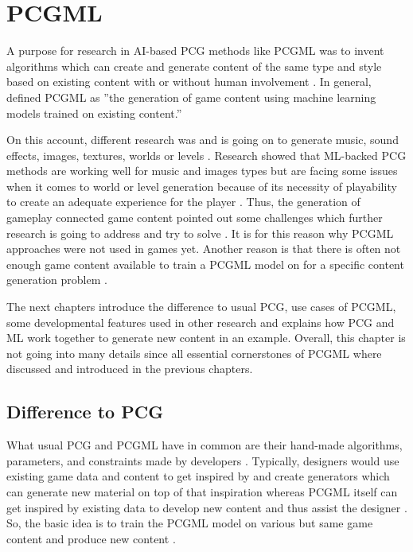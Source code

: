 \documentclass[MGS,Master,english]{twbook}%
\begin{document}
%
%
\clearpage
\chapter{\acl{PCGML}}
A purpose for research in AI-based PCG methods like PCGML was to invent algorithms which can create and generate content of the same type and style based on existing content with or without human involvement \cite{ai::book} \cite{pcgml::paper}. In general, \citep{pcgml::paper} defined PCGML as ''the generation of game content using machine learning models trained on existing content.'' 

On this account, different research was and is going on to generate music, sound effects, images, textures, worlds or levels \cite{ai::book}. Research showed that ML-backed PCG methods are working well for music and images types but are facing some issues when it comes to world or level generation because of its necessity of playability to create an adequate experience for the player \cite{ai::book}. Thus, the generation of gameplay connected game content pointed out some challenges which further research is going to address and try to solve \cite{ai::book}. It is for this reason why PCGML approaches were not used in games yet. Another reason is that there is often not enough game content available to train a PCGML model on for a specific content generation problem \cite{ai::book}. 

The next chapters introduce the difference to usual PCG, use cases of PCGML, some developmental features used in other research and explains how PCG and ML work together to generate new content in an example. Overall, this chapter is not going into many details since all essential cornerstones of PCGML where discussed and introduced in the previous chapters.

\section{Difference to \acl{PCG}}
What usual PCG and PCGML have in common are their hand-made algorithms, parameters, and constraints made by developers \cite{pcgml::paper}. Typically, designers would use existing game data and content to get inspired by and create generators which can generate new material on top of that inspiration whereas PCGML itself can get inspired by existing data to develop new content and thus assist the designer \cite{pcgml::paper}. So, the basic idea is to train the PCGML model on various but same game content and produce new content \cite{pcgml::paper}. 
\end{document}
